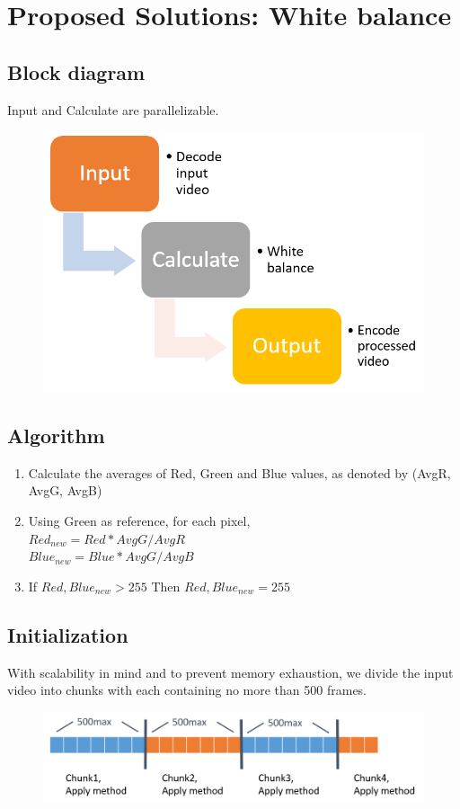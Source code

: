 \documentclass{acm_proc_article-sp}
\begin{document}
\section{Proposed Solutions: White balance}
\subsection{Block diagram}
Input and Calculate are parallelizable.
\begin{figure}[H]
  \includegraphics[width=\linewidth,natwidth=740,natheight=506]{block_diagram.png}
  \label{fig:block_diagram}
\end{figure}
\subsection{Algorithm}
\begin{enumerate}
  \item Calculate the averages of Red, Green and Blue values, as denoted by (AvgR, AvgG, AvgB)
  \item Using Green as reference, for each pixel, \\
    \(Red_{new} = Red * AvgG / AvgR\) \\
    \(Blue_{new} = Blue * AvgG / AvgB\)
  \item If \(Red,Blue_{new} > 255\) Then \(Red,Blue_{new} = 255\)
\end{enumerate}
\subsection{Initialization}
With scalability in mind and to prevent memory exhaustion, we divide the input video into chunks with each containing no more than 500 frames. \\
\begin{figure}[H]
  \includegraphics[width=\linewidth,natwidth=986,natheight=233]{chunks.png}
  \label{fig:chunks}
\end{figure}
\end{document}
